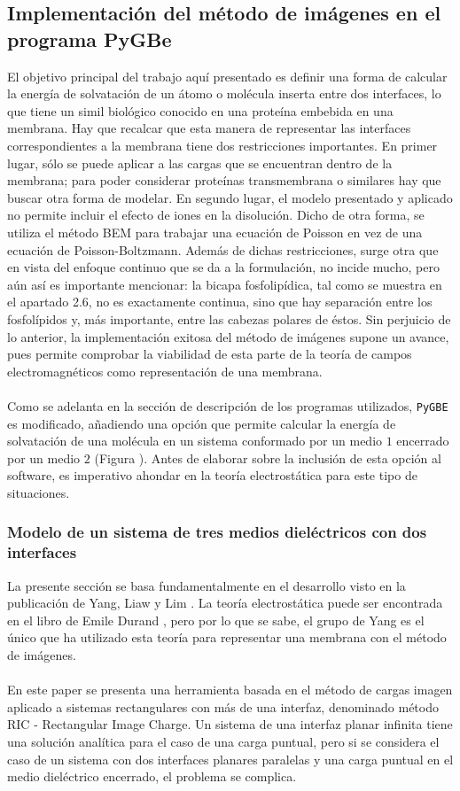 \documentclass[12pt, notitlepage]{article}
\numberwithin{equation}{section}
\begin{document}
\subsection{Implementación del método de imágenes en el programa PyGBe}
El objetivo principal del trabajo aquí presentado es definir una forma de calcular la energía de solvatación de un átomo o molécula inserta entre dos interfaces, lo que tiene un simil biológico conocido en una proteína embebida en una membrana. Hay que recalcar que esta manera de representar las interfaces correspondientes a la membrana tiene dos restricciones importantes. En primer lugar, sólo se puede aplicar a las cargas que se encuentran dentro de la membrana; para poder considerar proteínas transmembrana o similares hay que buscar otra forma de modelar. En segundo lugar, el modelo presentado y aplicado no permite incluir el efecto de iones en la disolución. Dicho de otra forma, se utiliza el método BEM para trabajar una ecuación de Poisson en vez de una ecuación de Poisson-Boltzmann. Además de dichas restricciones, surge otra que en vista del enfoque continuo que se da a la formulación, no incide mucho, pero aún así es importante mencionar: la bicapa fosfolipídica, tal como se muestra en el apartado 2.6, no es exactamente continua, sino que hay separación entre los fosfolípidos y, más importante, entre las cabezas polares de éstos. Sin perjuicio de lo anterior, la implementación exitosa del método de imágenes supone un avance, pues permite comprobar la viabilidad de esta parte de la teoría de campos electromagnéticos como representación de una membrana.\\\\
Como se adelanta en la sección de descripción de los programas utilizados, \texttt{PyGBE} es modificado, añadiendo una opción que permite calcular la energía de solvatación de una molécula en un sistema conformado por un medio $1$ encerrado por un medio $2$ (Figura ). Antes de elaborar sobre la inclusión de esta opción al software, es imperativo ahondar en la teoría electrostática para este tipo de situaciones.

\subsubsection{Modelo de un sistema de tres medios dieléctricos con dos interfaces}
La presente sección se basa fundamentalmente en el desarrollo visto en la publicación de Yang, Liaw y Lim \cite{Pei-kun}. La teoría electrostática puede ser encontrada en el libro de Emile Durand \cite{Durand}, pero por lo que se sabe, el grupo de Yang es el único que ha utilizado esta teoría para representar una membrana con el método de imágenes.\\\\
En este paper se presenta una herramienta basada en el método de cargas imagen aplicado a sistemas rectangulares con más de una interfaz, denominado método RIC - Rectangular Image Charge. Un sistema de una interfaz planar infinita tiene una solución analítica para el caso de una carga puntual, pero si se considera el caso de un sistema con dos interfaces planares paralelas y una carga puntual en el medio dieléctrico encerrado, el problema se complica.
\end{document}
